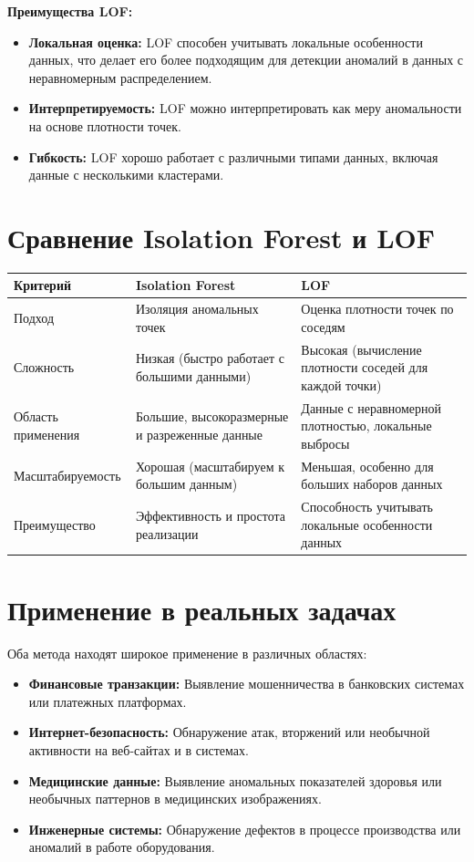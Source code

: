 \textbf{Преимущества LOF:}
\begin{itemize}
    \item \textbf{Локальная оценка:} LOF способен учитывать локальные особенности данных, что делает его более подходящим для детекции аномалий в данных с неравномерным распределением.
    \item \textbf{Интерпретируемость:} LOF можно интерпретировать как меру аномальности на основе плотности точек.
    \item \textbf{Гибкость:} LOF хорошо работает с различными типами данных, включая данные с несколькими кластерами.
\end{itemize}

\section{Сравнение Isolation Forest и LOF}
\begin{tabular}{|l|l|l|}
    \hline
    \textbf{Критерий}  & \textbf{Isolation Forest}                     & \textbf{LOF}                                            \\
    \hline
    Подход             & Изоляция аномальных точек                     & Оценка плотности точек по соседям                       \\
    Сложность          & Низкая (быстро работает с большими данными)   & Высокая (вычисление плотности соседей для каждой точки) \\
    Область применения & Большие, высокоразмерные и разреженные данные & Данные с неравномерной плотностью, локальные выбросы    \\
    Масштабируемость   & Хорошая (масштабируем к большим данным)       & Меньшая, особенно для больших наборов данных            \\
    Преимущество       & Эффективность и простота реализации           & Способность учитывать локальные особенности данных      \\
    \hline
\end{tabular}

\section{Применение в реальных задачах}
Оба метода находят широкое применение в различных областях:
\begin{itemize}
    \item \textbf{Финансовые транзакции:} Выявление мошенничества в банковских системах или платежных платформах.
    \item \textbf{Интернет-безопасность:} Обнаружение атак, вторжений или необычной активности на веб-сайтах и в системах.
    \item \textbf{Медицинские данные:} Выявление аномальных показателей здоровья или необычных паттернов в медицинских изображениях.
    \item \textbf{Инженерные системы:} Обнаружение дефектов в процессе производства или аномалий в работе оборудования.
\end{itemize}

